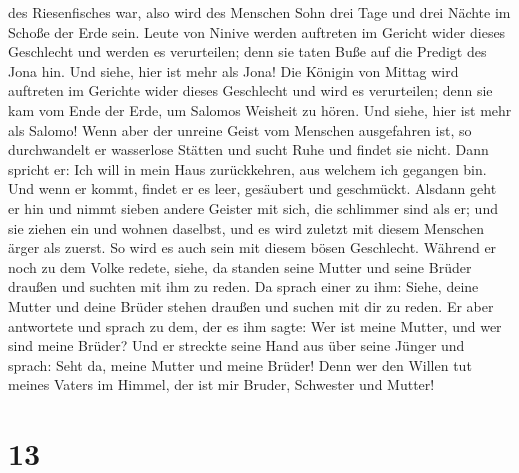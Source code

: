 des Riesenfisches war, also wird des Menschen Sohn drei Tage und drei
Nächte im Schoße der Erde sein.  Leute von Ninive werden
auftreten im Gericht wider dieses Geschlecht und werden es verurteilen;
denn sie taten Buße auf die Predigt des Jona hin. Und siehe, hier ist
mehr als Jona!  Die Königin von Mittag wird auftreten im
Gerichte wider dieses Geschlecht und wird es verurteilen; denn sie kam
vom Ende der Erde, um Salomos Weisheit zu hören. Und siehe, hier ist
mehr als Salomo!  Wenn aber der unreine Geist vom
Menschen ausgefahren ist, so durchwandelt er wasserlose Stätten und
sucht Ruhe und findet sie nicht.  Dann spricht er: Ich
will in mein Haus zurückkehren, aus welchem ich gegangen bin. Und wenn
er kommt, findet er es leer, gesäubert und geschmückt. 
Alsdann geht er hin und nimmt sieben andere Geister mit sich, die
schlimmer sind als er; und sie ziehen ein und wohnen daselbst, und es
wird zuletzt mit diesem Menschen ärger als zuerst. So wird es auch sein
mit diesem bösen Geschlecht.  Während er noch zu dem
Volke redete, siehe, da standen seine Mutter und seine Brüder draußen
und suchten mit ihm zu reden.  Da sprach einer zu ihm:
Siehe, deine Mutter und deine Brüder stehen draußen und suchen mit dir
zu reden.  Er aber antwortete und sprach zu dem, der es
ihm sagte: Wer ist meine Mutter, und wer sind meine Brüder?
 Und er streckte seine Hand aus über seine Jünger und
sprach: Seht da, meine Mutter und meine Brüder!  Denn wer
den Willen tut meines Vaters im Himmel, der ist mir Bruder, Schwester
und Mutter!

\hypertarget{section-12}{%
\section{13}\label{section-12}}

